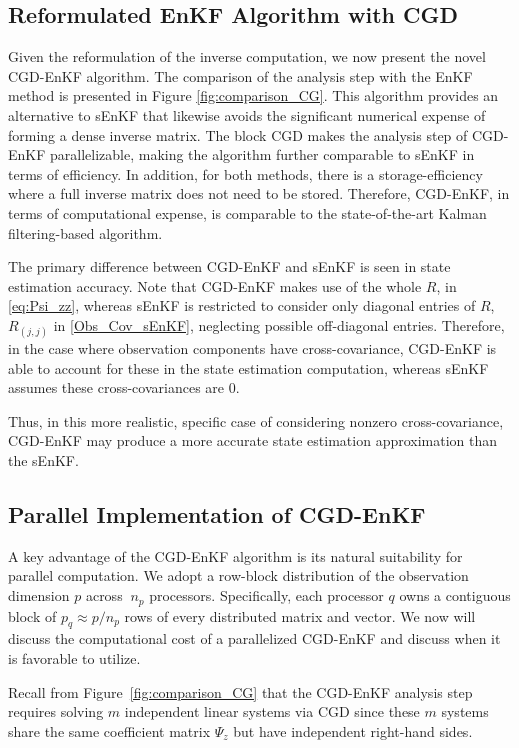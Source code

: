 \documentclass[11p]{elsarticle}
\numberwithin{equation}{section}
\begin{document}
\subsection{Reformulated EnKF Algorithm with CGD}
\label{sec:reformulatedAlgorithm}

Given the reformulation of the inverse computation, we now present the novel CGD-EnKF algorithm. 
The comparison of the analysis step with the EnKF method is presented in Figure \ref{fig:comparison_CG}.
This algorithm provides an alternative to sEnKF that likewise avoids the significant numerical expense of forming a dense inverse matrix.  The block CGD makes the analysis step of CGD-EnKF parallelizable, making the algorithm further comparable to sEnKF in terms of efficiency.  In addition, for both methods, there is a storage-efficiency where a full inverse matrix does not need to be stored.  Therefore, CGD-EnKF, in terms of computational expense, is comparable to the state-of-the-art Kalman filtering-based algorithm.

The primary difference between CGD-EnKF and sEnKF is seen in state estimation accuracy.  
Note that  CGD-EnKF makes use of the whole $R$, in \eqref{eq:Psi_zz}, whereas sEnKF is restricted to consider only diagonal entries of $R$,   $R_{(j,j)}$ in \eqref{Obs_Cov_sEnKF}, neglecting possible off-diagonal entries.  Therefore, in the case where observation components have cross-covariance, CGD-EnKF is able to account for these in the state estimation computation, whereas sEnKF assumes these cross-covariances are $0$.  


Thus, in this more realistic, specific case of considering nonzero cross-covariance, CGD-EnKF may produce a more accurate state estimation approximation than the sEnKF.

 \subsection{ Parallel Implementation of CGD-EnKF}\label{sec:parallel_cgd}
A key advantage of the CGD-EnKF algorithm is its natural suitability
  for parallel computation.  We adopt a row-block
  distribution of the observation dimension $p$ across $\ n_p$
  processors.  Specifically, each processor $q$ owns a contiguous block of
  $p_q \approx p/n_p$ rows of every distributed matrix and
  vector.  We now will discuss the computational cost of a parallelized CGD-EnKF and discuss when it is favorable to utilize.
  

 Recall from Figure~\ref{fig:comparison_CG} that the CGD-EnKF analysis step requires solving $m$ independent linear systems via CGD since these $m$ systems share the same coefficient matrix $\Psi_z$ but have independent right-hand sides.
\end{document}
